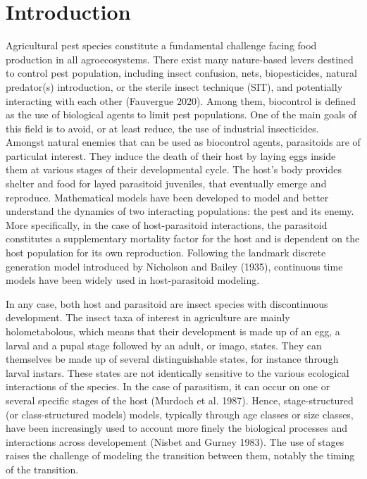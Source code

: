 \documentclass[12pt,a4paper,onecolumn]{article}
\begin{document}
\newpage
\setcounter{page}{1}






\section{Introduction}

\tabto{1 cm} Agricultural pest species constitute a fundamental challenge facing food production in all agroecosystems. There exist many nature-based levers destined to control pest population, including  insect confusion, nets, biopesticides, natural predator(s) introduction, or the sterile insect technique (SIT), and potentially interacting with each other (Fauvergue 2020). Among them, biocontrol is defined as the use of biological agents to limit pest populations. One of the main goals of this field is to avoid, or at least reduce, the use of industrial insecticides. Amongst natural enemies that can be used as biocontrol agents, parasitoids are of particulat interest. They induce the death of their host by laying eggs inside them at various stages of their developmental cycle. The host's body provides shelter and food for layed parasitoid juveniles, that eventually emerge and reproduce. Mathematical models have been developed to model and better understand the dynamics of two interacting populations: the pest and its enemy. More specifically, in the case of host-parasitoid interactions, the parasitoid constitutes a supplementary mortality factor for the host and is dependent on the host population for its own reproduction. Following the landmark discrete generation model introduced by Nicholson and Bailey (1935), continuous time models have been widely used in host-parasitoid modeling.

\tabto{1 cm} In any case, both host and parasitoid are insect species with discontinuous development. The insect taxa of interest in agriculture are mainly holometabolous, which means that their development is made up of an egg, a larval and a pupal stage followed by an adult, or imago, states. They can themselves be made up of several distinguishable states, for instance through larval instars. These states are not identically sensitive to the various ecological interactions of the species. In the case of parasitism, it can occur on one or several specific stages of the host (Murdoch et al. 1987). Hence, stage-structured (or class-structured models) models, typically through age classes or size classes, have been increasingly used to account more finely the biological processes and interactions across developement (Nisbet and Gurney 1983). The use of stages raises the challenge of modeling the transition between them, notably the timing of the transition.
\end{document}
